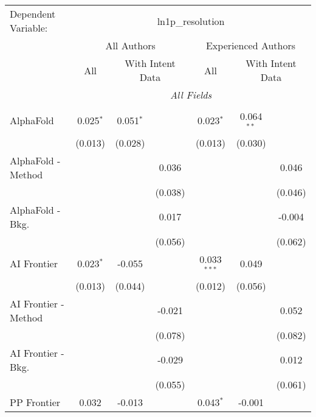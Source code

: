 \begingroup
\centering
\begin{tabular}{lcccccc}
   \tabularnewline \midrule \midrule
   Dependent Variable: & \multicolumn{6}{c}{ln1p\_resolution}\\
 & \multicolumn{3}{c}{All Authors} & \multicolumn{3}{c}{Experienced Authors} \\
\cmidrule(lr){2-4} \cmidrule(lr){5-7}
 & \multicolumn{1}{c}{All} & \multicolumn{2}{c}{With Intent Data} & \multicolumn{1}{c}{All} & \multicolumn{2}{c}{With Intent Data} \\
\cmidrule(lr){2-2} \cmidrule(lr){3-4} \cmidrule(lr){5-5} \cmidrule(lr){6-7}
 & \multicolumn{6}{c}{\textit{All Fields}} \\ \\
   AlphaFold            & 0.025$^{*}$ & 0.051$^{*}$ &         & 0.023$^{*}$   & 0.064$^{**}$ &   \\   
                        & (0.013)     & (0.028)     &         & (0.013)       & (0.030)      &   \\   
   AlphaFold - Method   &             &             & 0.036   &               &              & 0.046\\   
                        &             &             & (0.038) &               &              & (0.046)\\   
   AlphaFold - Bkg.     &             &             & 0.017   &               &              & -0.004\\   
                        &             &             & (0.056) &               &              & (0.062)\\   
   AI Frontier          & 0.023$^{*}$ & -0.055      &         & 0.033$^{***}$ & 0.049        &   \\   
                        & (0.013)     & (0.044)     &         & (0.012)       & (0.056)      &   \\   
   AI Frontier - Method &             &             & -0.021  &               &              & 0.052\\   
                        &             &             & (0.078) &               &              & (0.082)\\   
   AI Frontier - Bkg.   &             &             & -0.029  &               &              & 0.012\\   
                        &             &             & (0.055) &               &              & (0.061)\\   
   PP Frontier          & 0.032       & -0.013      &         & 0.043$^{*}$   & -0.001       &   \\   

\end{tabular}
